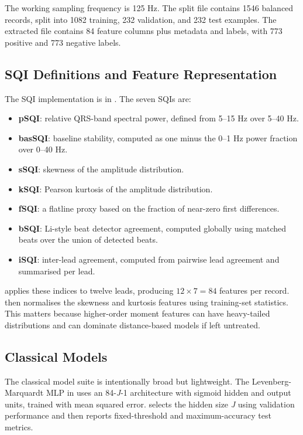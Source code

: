 \documentclass[11pt,a4paper]{article}
\begin{document}
The working sampling frequency is 125 Hz. The split file  contains 1546 balanced records, split into 1082 training, 232 validation, and 232 test examples. The extracted  file contains 84 feature columns plus metadata and labels, with 773 positive and 773 negative labels.

\subsection{SQI Definitions and Feature Representation}

The SQI implementation is in . The seven SQIs are:
\begin{itemize}
  \item \textbf{pSQI}: relative QRS-band spectral power, defined from 5--15 Hz over 5--40 Hz.
  \item \textbf{basSQI}: baseline stability, computed as one minus the 0--1 Hz power fraction over 0--40 Hz.
  \item \textbf{sSQI}: skewness of the amplitude distribution.
  \item \textbf{kSQI}: Pearson kurtosis of the amplitude distribution.
  \item \textbf{fSQI}: a flatline proxy based on the fraction of near-zero first differences.
  \item \textbf{bSQI}: Li-style beat detector agreement, computed globally using matched beats over the union of detected beats.
  \item \textbf{iSQI}: inter-lead agreement, computed from pairwise lead agreement and summarised per lead.
\end{itemize}

 applies these indices to twelve leads, producing $12 \times 7 = 84$ features per record.  then normalises the skewness and kurtosis features using training-set statistics. This matters because higher-order moment features can have heavy-tailed distributions and can dominate distance-based models if left untreated.

\subsection{Classical Models}

The classical model suite is intentionally broad but lightweight. The Levenberg-Marquardt MLP in  uses an 84-\textit{J}-1 architecture with sigmoid hidden and output units, trained with mean squared error.  selects the hidden size \textit{J} using validation performance and then reports fixed-threshold and maximum-accuracy test metrics.
\end{document}
